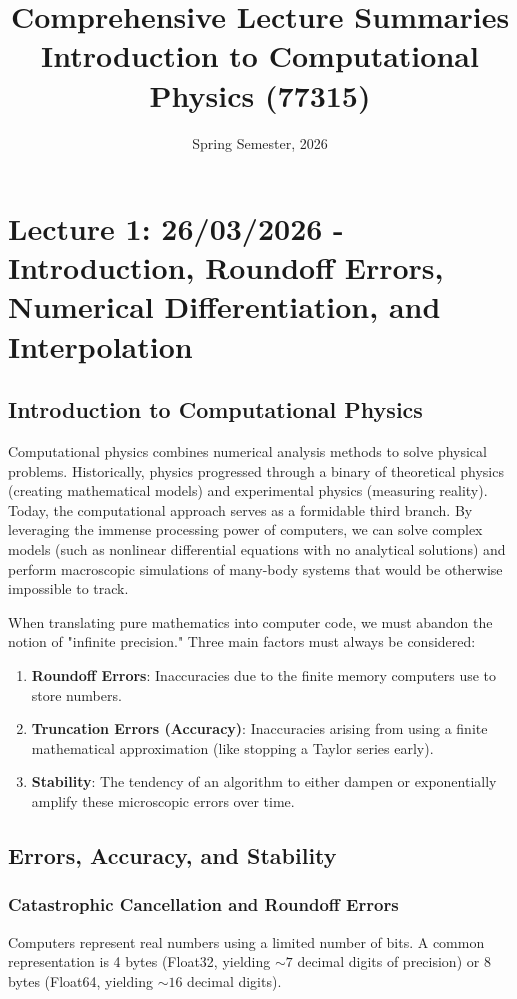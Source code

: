 \documentclass[12pt, a4paper]{article}
\title{Comprehensive Lecture Summaries\\ \Large Introduction to Computational Physics (77315)}
\author{}
\date{Spring Semester, 2026}
\begin{document}
\maketitle
\tableofcontents
\newpage

\section{Lecture 1: 26/03/2026 - Introduction, Roundoff Errors, Numerical Differentiation, and Interpolation}
\label{sec:lec1}

\subsection{Introduction to Computational Physics}
\label{subsec:intro}
Computational physics combines numerical analysis methods to solve physical problems. Historically, physics progressed through a binary of theoretical physics (creating mathematical models) and experimental physics (measuring reality). Today, the computational approach serves as a formidable third branch. By leveraging the immense processing power of computers, we can solve complex models (such as nonlinear differential equations with no analytical solutions) and perform macroscopic simulations of many-body systems that would be otherwise impossible to track.

When translating pure mathematics into computer code, we must abandon the notion of "infinite precision." Three main factors must always be considered:
\begin{enumerate}
    \item \textbf{Roundoff Errors}: Inaccuracies due to the finite memory computers use to store numbers.
    \item \textbf{Truncation Errors (Accuracy)}: Inaccuracies arising from using a finite mathematical approximation (like stopping a Taylor series early).
    \item \textbf{Stability}: The tendency of an algorithm to either dampen or exponentially amplify these microscopic errors over time.
\end{enumerate}

\subsection{Errors, Accuracy, and Stability}
\label{subsec:errors}

\subsubsection{Catastrophic Cancellation and Roundoff Errors}
Computers represent real numbers using a limited number of bits. A common representation is 4 bytes (Float32, yielding $\sim 7$ decimal digits of precision) or 8 bytes (Float64, yielding $\sim 16$ decimal digits). 
\end{document}
